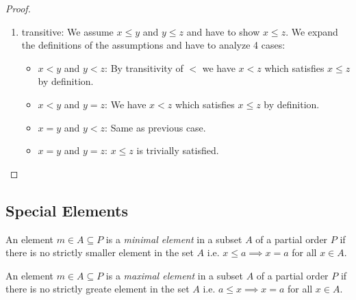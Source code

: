 \begin{definition}
\begin{proof}
\begin{itemize}
\begin{enumerate}
                    \item transitive: We assume $x \le y$ and $y \le z$ and have
                        to show $x \le z$. We expand the definitions of the
                        assumptions and have to analyze 4 cases:
                        \begin{itemize}
                            \item $x < y$ and $y < z$: By transitivity of $<$ we
                                have $x < z$ which satisfies $x \le z$ by
                                definition.

                            \item $x < y$ and $y = z$: We have $x < z$ which
                                satisfies $x \le z$ by definition.

                            \item $x = y$ and $y < z$: Same as previous case.

                            \item $x = y$ and $y = z$: $x \le z$ is trivially
                                satisfied.
                        \end{itemize}
                \end{enumerate}
        \end{itemize}
    \end{proof}
\end{definition}







\subsection{Special Elements}

\begin{definition}
    \label{defMinimalMaximalElement}

    An element $m \in A \subseteq P$ is a \emph{minimal element} in a subset $A$
    of a partial order $P$ if there is no strictly smaller element in the set
    $A$ i.e. $x \le a \implies x = a$ for all $x \in A$.


    An element $m \in A \subseteq P$ is a \emph{maximal element} in a subset $A$
    of a partial order $P$ if there is no strictly greate element in the set
    $A$ i.e. $a \le x \implies x = a$ for all $x \in A$.

\end{definition}



